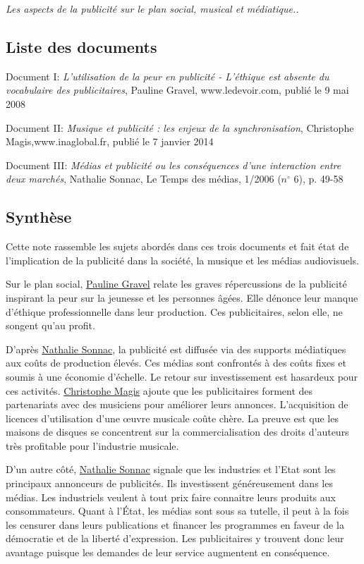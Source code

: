 \documentclass[11pt]{article}
\begin{document}
\emph{\large Les aspects de la publicité sur le plan social, musical et médiatique..}

\subsection{Liste des documents}
Document I: \textit{L'utilisation de la peur en publicité - L'éthique est absente du vocabulaire des publicitaires}, Pauline Gravel, www.ledevoir.com, publié le 9 mai 2008

Document II: \textit{Musique et publicité : les enjeux de la synchronisation}, Christophe Magis,\newline www.inaglobal.fr, publié le 7 janvier 2014

Document III: \textit{Médias et publicité ou les conséquences d’une interaction entre deux marchés}, Nathalie Sonnac, Le Temps des médias, 1/2006 ($n^{\circ}$ 6), p. 49-58 


\subsection{Synthèse}

Cette note rassemble les sujets abordés dans ces trois documents et fait état de l’implication de la publicité dans la société, la musique et les médias audiovisuels.

 Sur le plan social, \underline{Pauline Gravel} relate les graves répercussions de la publicité inspirant la peur sur la jeunesse et les personnes âgées. Elle dénonce leur manque d’éthique professionnelle dans leur production. Ces publicitaires, selon elle, ne songent qu’au profit.

D’après \underline{Nathalie Sonnac}, la publicité est diffusée via des supports médiatiques aux coûts de production élevés. Ces médias sont confrontés à des coûts fixes et soumis à une économie d'échelle. Le retour sur investissement est hasardeux pour ces activités. \underline{Christophe Magis} ajoute que les publicitaires forment des partenariats avec des musiciens pour améliorer leurs annonces. L’acquisition de licences d’utilisation d’une \oe uvre musicale coûte chère. La preuve est que les maisons de disques se concentrent sur la commercialisation des droits d’auteurs très profitable pour l’industrie musicale.

D’un autre côté, \underline{Nathalie Sonnac} signale que les industries et l’Etat sont les principaux annonceurs de publicités. Ils investissent généreusement dans les médias. Les industriels veulent à tout prix faire connaitre leurs produits aux consommateurs. Quant à l’État, les médias sont sous sa tutelle, il peut à la fois les censurer dans leurs publications et financer les programmes en faveur de la démocratie et de la liberté d’expression. Les publicitaires y trouvent donc leur avantage puisque les demandes de leur service augmentent en conséquence.
\end{document}
